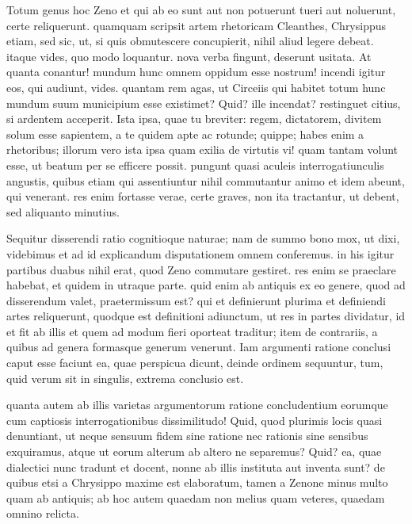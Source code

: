  Totum genus hoc Zeno et qui ab eo sunt aut non potuerunt tueri aut noluerunt, certe reliquerunt. quamquam scripsit artem rhetoricam Cleanthes, Chrysippus etiam, sed sic, ut, si quis obmutescere concupierit, nihil aliud legere debeat. itaque vides, quo modo loquantur. nova verba fingunt, deserunt usitata. At quanta conantur! mundum hunc omnem oppidum esse nostrum! incendi igitur eos, qui audiunt, vides. quantam rem agas, ut Circeiis qui habitet totum hunc mundum suum municipium esse existimet? Quid? ille incendat? restinguet citius, si ardentem acceperit. Ista ipsa, quae tu breviter: regem, dictatorem, divitem solum esse sapientem, a te quidem apte ac rotunde; quippe; habes enim a rhetoribus; illorum vero ista ipsa quam exilia de virtutis vi! quam tantam volunt esse, ut beatum per se efficere possit. pungunt quasi aculeis interrogatiunculis angustis, quibus etiam qui assentiuntur nihil commutantur animo et idem abeunt, qui venerant. res enim fortasse verae, certe graves, non ita tractantur, ut debent, sed aliquanto minutius.

 Sequitur disserendi ratio cognitioque naturae; nam de summo bono mox, ut dixi, videbimus et ad id explicandum disputationem omnem conferemus. in his igitur partibus duabus nihil erat, quod Zeno commutare gestiret. res enim se praeclare habebat, et quidem in utraque parte. quid enim ab antiquis ex eo genere, quod ad disserendum valet, praetermissum est? qui et definierunt plurima et definiendi artes reliquerunt, quodque est definitioni adiunctum, ut res in partes dividatur, id et fit ab illis et quem ad modum fieri oporteat traditur; item de contrariis, a quibus ad genera formasque generum venerunt. Iam argumenti ratione conclusi caput esse faciunt ea, quae perspicua dicunt, deinde ordinem sequuntur, tum, quid verum sit in singulis, extrema conclusio est.

 quanta autem ab illis varietas argumentorum ratione concludentium eorumque cum captiosis interrogationibus dissimilitudo! Quid, quod plurimis locis quasi denuntiant, ut neque sensuum fidem sine ratione nec rationis sine sensibus exquiramus, atque ut eorum alterum ab altero ne separemus? Quid? ea, quae dialectici nunc tradunt et docent, nonne ab illis instituta aut inventa sunt? de quibus etsi a Chrysippo maxime est elaboratum, tamen a Zenone minus multo quam ab antiquis; ab hoc autem quaedam non melius quam veteres, quaedam omnino relicta.

